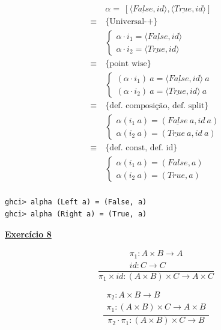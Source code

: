 \documentclass[a4paper,11pt]{article}
\begin{document}
	\[
	\begin{aligned}
		&\alpha = \ [\langle \underline{False}, id \rangle, \langle \underline{True}, id \rangle] \\
		\equiv \  &\{\text{Universal-+}\}\\
		&\begin{cases}
			\alpha \cdot i_1 = \langle \underline{False}, id \rangle \\
			\alpha \cdot i_2 = \langle \underline{True}, id \rangle
		\end{cases}\\
		\equiv \  &\{\text{point wise}\}\\
		&\begin{cases}
			(\alpha \cdot i_1) \ a = \langle \underline{False}, id \rangle \ a \\
			(\alpha \cdot i_2) \ a = \langle \underline{True}, id \rangle \ a
		\end{cases}\\
		\equiv \  &\{\text{def. composição, def. split}\}\\
		&\begin{cases}
			\alpha (i_1 \ a) = (\underline{False} \ a, id \ a) \\
			\alpha (i_2 \ a) = (\underline{True} \ a, id \ a)
		\end{cases}\\
		\equiv \  &\{\text{def. const, def. id}\}\\
		&\begin{cases}
			\alpha (i_1 \ a) = (False, a) \\
			\alpha (i_2 \ a) = (True, a)
		\end{cases}\\
	\end{aligned}
	\]
	
\begin{verbatim}
ghci> alpha (Left a) = (False, a)
ghci> alpha (Right a) = (True, a)
\end{verbatim}
	
	\noindent \underline{\textbf{Exercício 8}}\\
	
	\begin{minipage}{0.5\textwidth}
		\[
		\frac{
			\begin{array}{c}
				\pi_1: A \times B \rightarrow A \\
				id: C \rightarrow C
			\end{array}
		}{
			\pi_1 \times id: (A \times B) \times C \rightarrow A \times C
		}
		\]
	\end{minipage}
	\hfill
	\begin{minipage}{0.5\textwidth}
		\[
		\frac{
			\begin{array}{c}
				\pi_2: A \times B \rightarrow B \\
				\pi_1: (A \times B) \times C \rightarrow A \times B
			\end{array}
		}{
			\pi_2 \cdot \pi_1: (A \times B) \times C \rightarrow B
		}
		\]
	\end{minipage}\\
	
\end{document}
